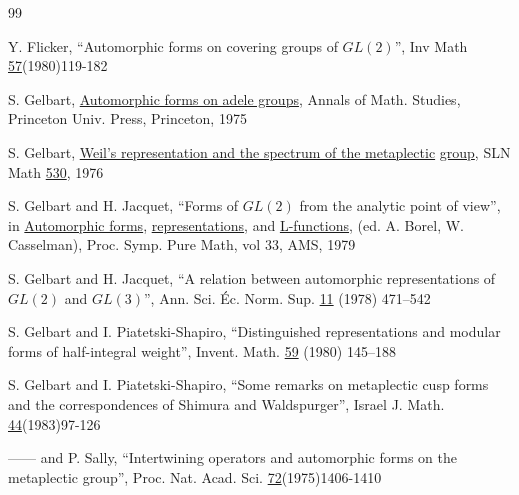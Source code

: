 \documentclass[12pt,letterpaper]{book}
\theoremstyle{plain}
\theoremstyle{definition}
\theoremstyle{remark}
\theoremstyle{remark}
\begin{document}
\begin{thebibliography}{99}

 Y. Flicker, ``Automorphic forms on covering groups of
$GL(2)$'', Inv
Math \underline{57}(1980)119-182


 S. Gelbart, \underline{Automorphic forms on adele groups},
Annals of
Math. Studies, Princeton Univ. Press, Princeton, 1975

 S. Gelbart, \underline{Weil's representation and the
spectrum of the metaplectic} \underline{group},
SLN Math \underline{530}, 1976

 S. Gelbart and H. Jacquet,
``Forms of $GL(2)$ from the analytic
point of view'', in \underline{Automorphic forms},
\underline{representations}, and \underline{L-functions},
(ed. A. Borel, W. Casselman), Proc. Symp. Pure Math, vol 33, AMS, 1979


 S. Gelbart and H. Jacquet, ``A relation between
automorphic representations of $GL(2)$ and $GL(3)$'', Ann. Sci. \'Ec.
Norm. Sup. \underline{11} (1978) 471--542

 S. Gelbart and I. Piatetski-Shapiro, ``Distinguished
representations and modular forms of half-integral weight'', Invent.
Math. \underline{59} (1980) 145--188

 S. Gelbart and I. Piatetski-Shapiro, ``Some remarks
on metaplectic cusp
forms and the correspondences of Shimura and Waldspurger'', Israel
J. Math.
\underline{44}(1983)97-126

 ------ and P. Sally, ``Intertwining operators and
automorphic forms on the metaplectic group'', Proc. Nat. Acad. Sci.
\underline{72}(1975)1406-1410



\end{thebibliography}
\end{document}
